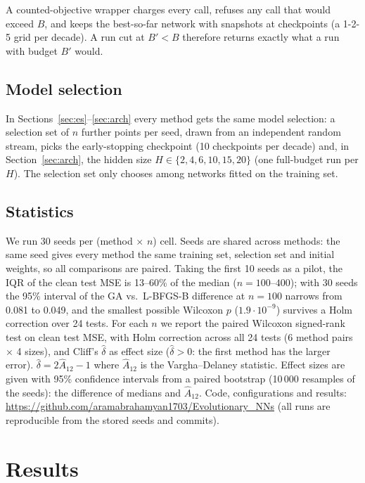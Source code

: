 \documentclass[11pt,a4paper]{article}
\newcommand{\lbfgs}{L-BFGS-B}
\newcommand{\B}{B}
\begin{document}
A counted-objective wrapper charges every call, refuses any call that would exceed $\B$, and keeps
the best-so-far network with snapshots at checkpoints (a 1-2-5 grid per decade). A run cut at
$B'<\B$ therefore returns exactly what a run with budget $B'$ would.

\subsection{Model selection}

In Sections~\ref{sec:es}--\ref{sec:arch} every method gets the same model selection: a selection set of
$n$ further points per seed, drawn from an independent random stream, picks the early-stopping checkpoint
(10 checkpoints per decade) and, in Section~\ref{sec:arch}, the hidden size $H\in\{2,4,6,10,15,20\}$ (one
full-budget run per $H$). The selection set only chooses among networks fitted on the training set.

\subsection{Statistics}

We run 30 seeds per (method $\times$ $n$) cell. Seeds are shared across methods: the same seed gives every
method the same training set, selection set and initial weights, so all comparisons are paired. Taking the
first 10 seeds as a pilot, the IQR of the clean test MSE is 13--60\% of the median ($n=100$--$400$); with
30 seeds the 95\% interval of the GA vs.\ \lbfgs{} difference at $n=100$ narrows from 0.081 to 0.049, and
the smallest possible Wilcoxon $p$ ($1.9\cdot10^{-9}$) survives a Holm correction over 24 tests.
For each $n$ we report the paired Wilcoxon signed-rank test on clean test MSE, with Holm correction
across all 24 tests (6 method pairs $\times$ 4 sizes), and Cliff's $\hat\delta$ as effect size \citep{cliff1993dominance,vargha2000,arcuri2011} ($\hat\delta>0$: the first
method has the larger error).
$\hat\delta = 2\hat{A}_{12}-1$ where $\hat{A}_{12}$ is the Vargha--Delaney statistic.
Effect sizes are given with 95\% confidence intervals from a paired bootstrap (10\,000 resamples of the
seeds): the difference of medians and $\hat{A}_{12}$.
Code, configurations and results: \url{https://github.com/aramabrahamyan1703/Evolutionary_NNs} (all runs
are reproducible from the stored seeds and commits).

\section{Results}
\label{sec:results}
\end{document}
